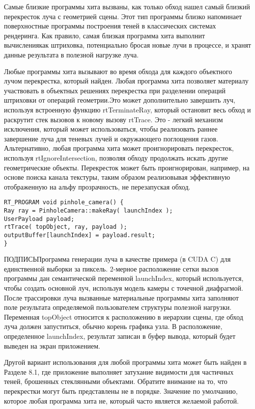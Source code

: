 Самые близкие программы хита вызваны, как только обход нашел самый близкий перекресток луча с геометрией сцены. Этот тип программы близко напоминает поверхностные программы построения теней в классических системах рендеринга. Как правило, самая близкая программа хита выполнит вычислениякак штриховка, потенциально бросая новые лучи в процессе, и хранят данные результата в полезной нагрузке луча. 

Любые программы хита вызывают во время обхода для каждого объектного лучом перекрестка, который найден. Любая программа хита позволяет материалу участвовать в объектных решениях перекрестка при разделении операций штриховки от операций геометрии.Это может дополнительно завершить луч, используя встроенную функцию rtTerminateRay, который остановит весь обход и раскрутит стек вызовов к новому вызову rtTrace. Это - легкий механизм исключения, который может использоваться, чтобы реализовать раннее завершение луча для теневых лучей и окружающего поглощения газов. Альтернативно, любая программа хита может проигнорировать перекресток, используя rtIgnoreIntersection, позволяя обходу продолжать искать другие геометрические объекты. Перекресток может быть проигнорирован, например, на основе поиска канала текстуры, таким образом реализовывая эффективную отображенную на альфу прозрачность, не перезапуская обход.
\begin{verbatim}
RT_PROGRAM void pinhole_camera() {
Ray ray = PinholeCamera::makeRay( launchIndex );
UserPayload payload;
rtTrace( topObject, ray, payload );
outputBuffer[launchIndex] = payload.result;
}
\end{verbatim}
ПОДПИСЬ{Программа генерации луча в качестве примера (в CUDA C) для единственной выборки за пиксель. 2-мерное расположение сетки вызов программы дан семантической переменной launchIndex, который используется, чтобы создать основной луч, используя модель камеры с точечной диафрагмой. После трассировки луча вызванные материальные программы хита заполняют поле результата определяемой пользователем структуры полезной нагрузки. Переменная topObject относится к расположению в иерархии сцены, где обход луча должен запуститься, обычно корень графика узла. В
расположение, определенное launchIndex, результат записан в буфер вывода, который будет выведен на экран приложением.}


  Другой вариант использования для любой программы хита может быть найден в Разделе 8.1, где приложение выполняет затухание видимости для частичных теней, брошенных стеклянными объектами. Обратите внимание на то, что перекрестки могут быть представлены не в порядке. Значение по умолчанию, которое любая программа хита не, который часто является желаемой работой.

